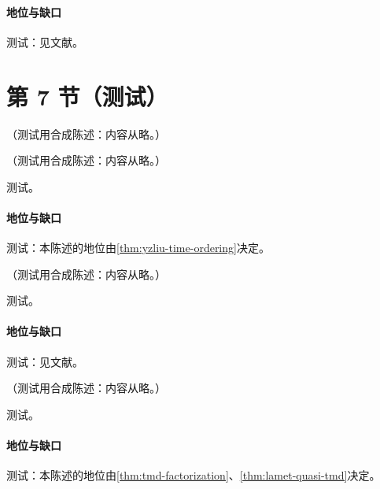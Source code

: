 \paragraph{地位与缺口}测试：见文献。

\section{第 7 节（测试）}\label{sec:yzliu-exclusive}

\begin{example}[单圈 $H=C^+_{HL}C^-_{HL}$ 与相位]\label{ex:yzliu-hl-decomposition}
（测试用合成陈述：内容从略。）
\end{example}

\begin{proposition}\label{prop:yzliu-lfwf}
（测试用合成陈述：内容从略。）
\end{proposition}
\begin{proofsketch}测试。\end{proofsketch}
\paragraph{地位与缺口}测试：本陈述的地位由\cref{thm:yzliu-time-ordering}决定。

\begin{proposition}\label{prop:yzliu-meson-ff}
（测试用合成陈述：内容从略。）
\end{proposition}
\begin{proofsketch}测试。\end{proofsketch}
\paragraph{地位与缺口}测试：见文献。

\begin{proposition}\label{prop:yzliu-dy-quasi}
（测试用合成陈述：内容从略。）
\end{proposition}
\begin{proofsketch}测试。\end{proofsketch}
\paragraph{地位与缺口}测试：本陈述的地位由\cref{thm:tmd-factorization}、\cref{thm:lamet-quasi-tmd}决定。

